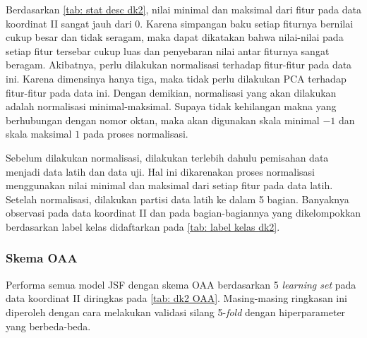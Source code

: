 \noindent Berdasarkan \ref{tab: stat desc dk2}, nilai minimal dan maksimal dari fitur pada data koordinat II sangat jauh dari 0. Karena simpangan baku setiap fiturnya bernilai cukup besar dan tidak seragam, maka dapat dikatakan bahwa nilai-nilai pada setiap fitur tersebar cukup luas dan penyebaran nilai antar fiturnya sangat beragam. Akibatnya,  perlu dilakukan normalisasi terhadap fitur-fitur pada data ini. Karena dimensinya hanya tiga, maka tidak perlu dilakukan PCA terhadap fitur-fitur pada data ini. Dengan demikian, normalisasi yang akan dilakukan adalah normalisasi minimal-maksimal. Supaya tidak kehilangan makna yang berhubungan dengan nomor oktan, maka akan digunakan skala minimal $-1$ dan skala maksimal $1$ pada proses normalisasi.

\noindent Sebelum dilakukan normalisasi, dilakukan terlebih dahulu pemisahan data menjadi data latih dan data uji. Hal ini dikarenakan proses normalisasi menggunakan nilai minimal dan maksimal dari setiap fitur pada data latih. Setelah normalisasi, dilakukan partisi data latih ke dalam 5 bagian. Banyaknya observasi pada data koordinat II dan pada bagian-bagiannya yang dikelompokkan berdasarkan label kelas didaftarkan pada \ref{tab: label kelas dk2}.

\subsubsection{Skema OAA}
\noindent Performa semua model JSF dengan skema OAA berdasarkan 5 \emph{learning set} pada data koordinat II diringkas pada \ref{tab: dk2 OAA}.  Masing-masing ringkasan ini diperoleh dengan cara melakukan validasi silang 5-\emph{fold} dengan hiperparameter yang berbeda-beda.

